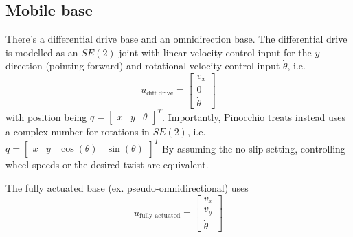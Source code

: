 \subsection{Mobile base}
There's a differential drive base and an omnidirection base.
The differential drive is modelled as an $ SE (2)  $ joint with
linear velocity control input for the $ y  $ direction (pointing forward)
and rotational velocity control input $ \dot{\theta}  $, i.e.
\begin{equation}
u_{ \text{diff drive} } = 
\begin{bmatrix} 
v_{ x } \\
0\\
\dot{\theta}
\end{bmatrix} 
\end{equation}
with position being 
$ q = \begin{bmatrix} x & y & \theta \end{bmatrix}^{ T }   $. 
Importantly, Pinocchio treats instead uses a complex number for
rotations in 
$ SE (2)  $, i.e. 
$ q = \begin{bmatrix} x & y & \cos(\theta) & \sin(\theta) \end{bmatrix}^{ T }      $
By assuming the no-slip setting, controlling
wheel speeds or the desired twist are equivalent.

The fully actuated base (ex. pseudo-omnidirectional) uses
\begin{equation}
u_{ \text{fully actuated} } = 
\begin{bmatrix} v_{ x }\\ v_{ y } \\ \dot{\theta} \end{bmatrix} 
\end{equation}

